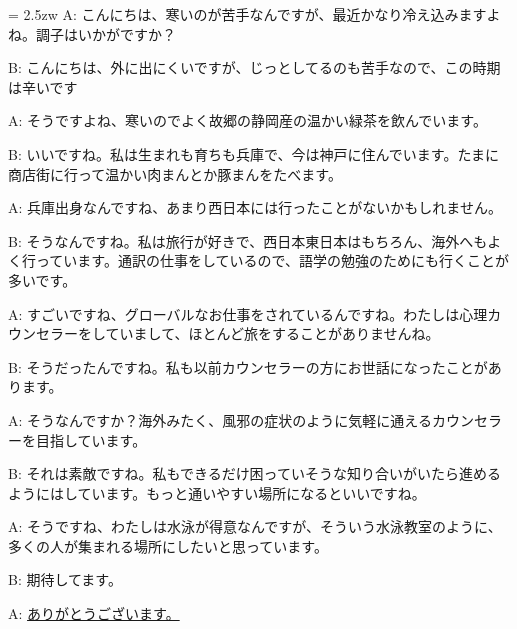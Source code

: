 \documentclass[11pt]{amsart}
\title{}
\author{}
\newenvironment{hangall}[1]{\hangindent = 2.5zw\everypar{\hangindent = 2.5zw}}{}
\begin{document}
\maketitle
\begin{hangall}{}%
A: こんにちは、寒いのが苦手なんですが、最近かなり冷え込みますよね。調子はいかがですか？

B: こんにちは、外に出にくいですが、じっとしてるのも苦手なので、この時期は辛いです

A: そうですよね、寒いのでよく故郷の静岡産の温かい緑茶を飲んでいます。

B: いいですね。私は生まれも育ちも兵庫で、今は神戸に住んでいます。たまに商店街に行って温かい肉まんとか豚まんをたべます。

A: 兵庫出身なんですね、あまり西日本には行ったことがないかもしれません。

B: そうなんですね。私は旅行が好きで、西日本東日本はもちろん、海外へもよく行っています。通訳の仕事をしているので、語学の勉強のためにも行くことが多いです。

A: すごいですね、グローバルなお仕事をされているんですね。わたしは心理カウンセラーをしていまして、ほとんど旅をすることがありませんね。

B: そうだったんですね。私も以前カウンセラーの方にお世話になったことがあります。

A: そうなんですか？海外みたく、風邪の症状のように気軽に通えるカウンセラーを目指しています。

B: それは素敵ですね。私もできるだけ困っていそうな知り合いがいたら進めるようにはしています。もっと通いやすい場所になるといいですね。

A: そうですね、わたしは水泳が得意なんですが、そういう水泳教室のように、多くの人が集まれる場所にしたいと思っています。

B: 期待してます。

A: \ul{ありがとうございます。}\end{hangall}
\end{document}
